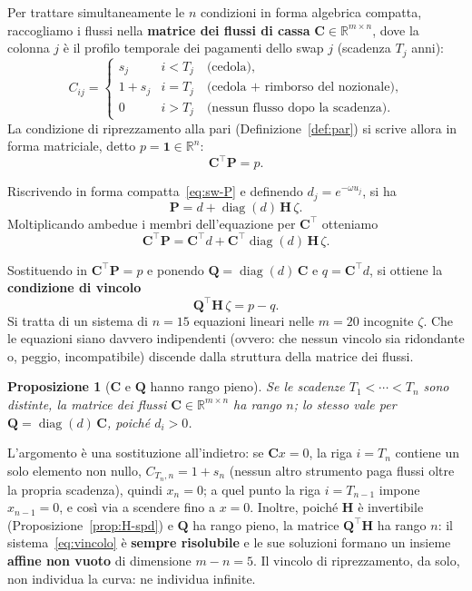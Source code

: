 \documentclass[11pt,a4paper]{article}
\theoremstyle{plain}
\newtheorem{proposizione}[teorema]{Proposizione}
\theoremstyle{definition}
\theoremstyle{remark}
\newcommand{\Qmat}{\mathbf{Q}}
\newcommand{\Hmat}{\mathbf{H}}
\newcommand{\transp}{^{\!\top}}
\begin{document}
Per trattare simultaneamente le $n$ condizioni in forma algebrica compatta, raccogliamo i
flussi nella \textbf{matrice dei flussi di cassa} $\mathbf{C}\in\mathbb{R}^{m\times n}$,
dove la colonna $j$ \`e il profilo temporale dei pagamenti dello swap $j$ (scadenza $T_j$ anni):
\[
  C_{ij} =
  \begin{cases}
    s_j     & i < T_j \quad\text{(cedola),}\\
    1 + s_j & i = T_j \quad\text{(cedola + rimborso del nozionale),}\\
    0        & i > T_j \quad\text{(nessun flusso dopo la scadenza).}
  \end{cases}
\]
La condizione di riprezzamento alla pari (Definizione~\ref{def:par}) si scrive allora in forma
matriciale, detto $p = \mathbf{1} \in \mathbb{R}^n$:
\[
  \mathbf{C}\transp \mathbf{P} = p .
\]

Riscrivendo in forma compatta~\eqref{eq:sw-P} e definendo $d_j = e^{-\omega u_j}$, si ha
\[
  \mathbf{P} = d + \operatorname{diag}(d)\,\Hmat\,\zeta .
\]
Moltiplicando ambedue i membri dell'equazione per $\mathbf{C}\transp$ otteniamo
\[
  \mathbf{C}\transp \mathbf{P} = \mathbf{C}\transp d + \mathbf{C}\transp \operatorname{diag}(d)\,\Hmat\,\zeta .
\]

Sostituendo in $\mathbf{C}\transp \mathbf{P} = p$ e ponendo
$\Qmat = \operatorname{diag}(d)\,\mathbf{C}$ e $q = \mathbf{C}\transp d$, si ottiene la
\textbf{condizione di vincolo}
\begin{equation}
  \Qmat\transp \Hmat\, \zeta = p - q .
  \label{eq:vincolo}
\end{equation}
Si tratta di un sistema di $n=15$ equazioni lineari nelle $m=20$ incognite $\zeta$. Che le
equazioni siano davvero indipendenti (ovvero: che nessun vincolo sia ridondante o, peggio,
incompatibile) discende dalla struttura della matrice dei flussi.

\begin{proposizione}[$\mathbf{C}$ e $\Qmat$ hanno rango pieno]
\label{prop:rango}
Se le scadenze $T_1<\cdots<T_n$ sono distinte, la matrice dei flussi
$\mathbf{C}\in\mathbb{R}^{m\times n}$ ha rango $n$; lo stesso vale per
$\Qmat=\operatorname{diag}(d)\,\mathbf{C}$, poich\'e $d_i>0$.
\end{proposizione}

L'argomento \`e una sostituzione all'indietro: se $\mathbf{C}x=0$, la riga $i=T_n$ contiene
un solo elemento non nullo, $C_{T_n,n}=1+s_n$ (nessun altro strumento paga flussi oltre la
propria scadenza), quindi $x_n=0$; a quel punto la riga $i=T_{n-1}$ impone $x_{n-1}=0$, e
cos\`i via a scendere fino a $x=0$. Inoltre, poich\'e $\Hmat$ \`e invertibile
(Proposizione~\ref{prop:H-spd}) e $\Qmat$ ha rango pieno, la matrice $\Qmat\transp\Hmat$ ha
rango $n$: il sistema~\eqref{eq:vincolo} \`e \textbf{sempre risolubile} e le sue soluzioni
formano un insieme \textbf{affine non vuoto} di dimensione $m-n=5$. Il vincolo di
riprezzamento, da solo, non individua la curva: ne individua infinite.
\end{document}
